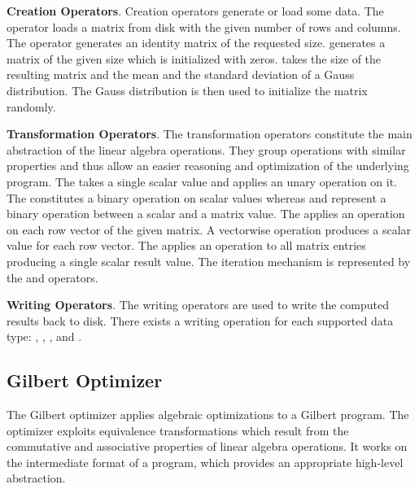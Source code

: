 \textbf{Creation Operators}. Creation operators generate or load some data.
The  operator loads a matrix from disk with the given number of rows and columns.
The  operator generates an identity matrix of the requested size.
 generates a matrix of the given size which is initialized with zeros.
 takes the size of the resulting matrix and the mean and the standard deviation of a Gauss distribution.
The Gauss distribution is then used to initialize the matrix randomly.

\textbf{Transformation Operators}. The transformation operators constitute the main abstraction of the linear algebra operations.
They group operations with similar properties and thus allow an easier reasoning and optimization of the underlying program. 
The  takes a single scalar value and applies an unary operation on it. 
The  constitutes a binary operation on scalar values whereas  and  represent a binary operation between a scalar and a matrix value. 
The  applies an operation on each row vector of the given matrix.
A vectorwise operation produces a scalar value for each row vector. 
The  applies an operation to all matrix entries producing a single scalar result value. 
The iteration mechanism is represented by the  and  operators. 

\textbf{Writing Operators}. The writing operators are used to write the computed results back to disk.
There exists a writing operation for each supported data type: , , ,  and .

\subsection{Gilbert Optimizer}
\label{sec:gilbertOptimizer}

The Gilbert optimizer applies algebraic optimizations to a Gilbert program.
The optimizer exploits equivalence transformations which result from the commutative and associative properties of linear algebra operations.
It works on the intermediate format of a program, which provides an appropriate high-level abstraction.

